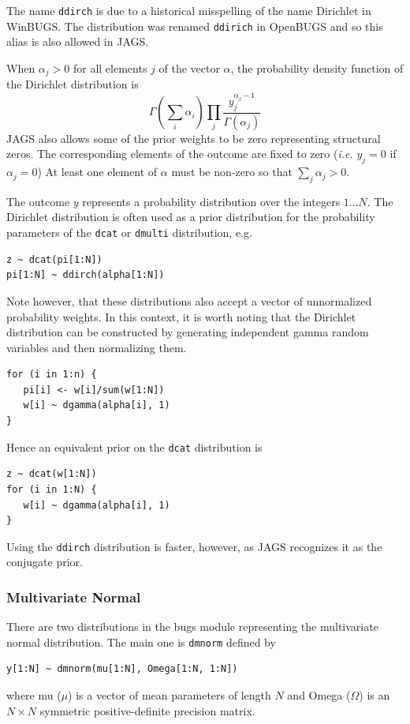 \documentclass[11pt, a4paper, titlepage]{report}
\begin{document}
The name \texttt{ddirch} is due to a historical misspelling of the
name Dirichlet in WinBUGS. The distribution was renamed
\texttt{ddirich} in OpenBUGS and so this alias is also allowed in
JAGS.

When $\alpha_j > 0$ for all elements $j$ of the vector $\alpha$, the
probability density function of the Dirichlet distribution is 
\[
\Gamma(\sum_i \alpha_i) \prod_j 
\frac{\textstyle y_j^{\alpha_j - 1}}{\textstyle \Gamma(\alpha_j)}
\]
JAGS also allows some of the prior weights to be zero representing
structural zeros. The corresponding elements of the outcome are fixed
to zero ({\em i.e.}  $y_j = 0$ if $\alpha_j = 0$) At least one
element of $\alpha$ must be non-zero so that $\sum_j \alpha_j > 0$.

The outcome $y$ represents a probability distribution over the
integers $1 \ldots N$. The Dirichlet distribution is often used as
a prior distribution for the probability parameters of the \texttt{dcat}
or \texttt{dmulti} distribution, e.g.
\begin{verbatim}
z ~ dcat(pi[1:N])
pi[1:N] ~ ddirch(alpha[1:N])
\end{verbatim}
Note however, that these distributions also accept a vector of
unnormalized probability weights. In this context, it is worth noting
that the Dirichlet distribution can be constructed by generating
independent gamma random variables and then normalizing them.
\begin{verbatim}
for (i in 1:n) {
   pi[i] <- w[i]/sum(w[1:N])
   w[i] ~ dgamma(alpha[i], 1)
}
\end{verbatim}
Hence an equivalent prior on the \texttt{dcat} distribution is
\begin{verbatim}
z ~ dcat(w[1:N])
for (i in 1:N) {
   w[i] ~ dgamma(alpha[i], 1)
}
\end{verbatim}
Using the \texttt{ddirch} distribution is faster, however, as
JAGS recognizes it as the conjugate prior.

\subsubsection{Multivariate Normal}

There are two distributions in the bugs module representing the
multivariate normal distribution. The main one is \texttt{dmnorm}
defined by
\begin{verbatim}
y[1:N] ~ dmnorm(mu[1:N], Omega[1:N, 1:N])
\end{verbatim}
where mu ($\mu$) is a vector of mean parameters of length $N$ and
Omega ($\Omega$) is an $N \times N$ symmetric positive-definite
precision matrix.
\end{document}
